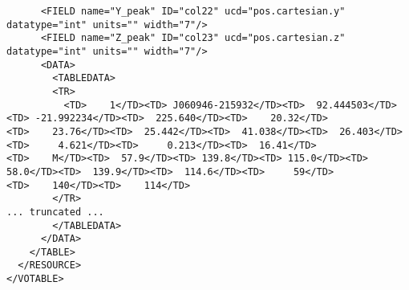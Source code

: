 {\begin{verbatim}
      <FIELD name="Y_peak" ID="col22" ucd="pos.cartesian.y" datatype="int" units="" width="7"/>
      <FIELD name="Z_peak" ID="col23" ucd="pos.cartesian.z" datatype="int" units="" width="7"/>
      <DATA>
        <TABLEDATA>
        <TR>
          <TD>    1</TD><TD> J060946-215932</TD><TD>  92.444503</TD><TD> -21.992234</TD><TD>  225.640</TD><TD>    20.32</TD>
<TD>    23.76</TD><TD>  25.442</TD><TD>  41.038</TD><TD>  26.403</TD><TD>     4.621</TD><TD>     0.213</TD><TD>  16.41</TD>
<TD>    M</TD><TD>  57.9</TD><TD> 139.8</TD><TD> 115.0</TD><TD>   58.0</TD><TD>  139.9</TD><TD>  114.6</TD><TD>     59</TD>
<TD>    140</TD><TD>    114</TD>
        </TR>
... truncated ...
        </TABLEDATA>
      </DATA>
    </TABLE>
  </RESOURCE>
</VOTABLE>
  \end{verbatim}
}

